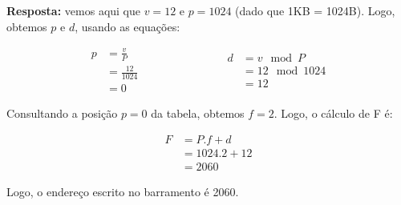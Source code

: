 \textbf{Resposta:} vemos aqui que $v = 12$ e $p = 1024$ (dado que 1KB = 1024B). Logo, obtemos $p$ e $d$, usando as equações:

\begin{equation*}
  \begin{split}
    p & = \frac{v}{P} \\
      & = \frac{12}{1024} \\
      & = 0
  \end{split}
  \hspace{3cm}
  \begin{split}
    d & = v\mod P \\
      & = 12\mod 1024 \\
      & = 12
  \end{split}
\end{equation*}

Consultando a posição $p = 0$ da tabela, obtemos $f = 2$. Logo, o cálculo de F é:

\begin{equation*}
  \begin{split}
    F & = P . f + d \\
      & = 1024 . 2 + 12 \\
      & = 2060
  \end{split}
\end{equation*}

Logo, o endereço escrito no barramento é 2060.
